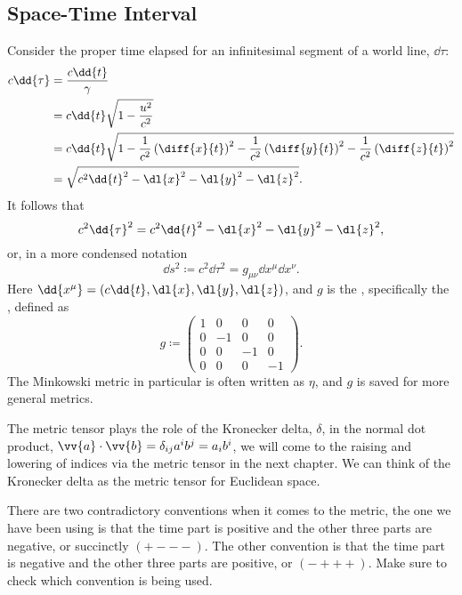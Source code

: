 \documentclass[fleqn]{NotesClass}
\begin{document}
    \subsection{Space-Time Interval}
    Consider the proper time elapsed for an infinitesimal segment of a world line, \(\dd{\tau}\):
    \begin{align}
        c\dd{\tau} &= \frac{c\dd{t}}{\gamma}\\
        &= c\dd{t}\sqrt{1 - \frac{u^2}{c^2}}\\
        &= c\dd{t}\sqrt{1 - \frac{1}{c^2}\left( \diff{x}{t} \right)^2 - \frac{1}{c^2}\left( \diff{y}{t} \right)^2 - \frac{1}{c^2}\left( \diff{z}{t} \right)^2}\\
        &= \sqrt{c^2\dd{t}^2 - \dl{x}^2 - \dl{y}^2 - \dl{z}^2}.
    \end{align}
    It follows that
    \begin{equation}
        c^2\dd{\tau}^2 = c^2\dd{t}^2 - \dl{x}^2 - \dl{y}^2 - \dl{z}^2,
    \end{equation}
    or, in a more condensed notation
    \begin{equation}
        \dd{s}^2 \coloneqq c^2\dd{\tau}^2 = g_{\mu\nu}\dd{x^\mu}\dd{x^\nu}.
    \end{equation}
    Here \(\dd{x^\mu} = (c\dd{t}, \dl{x}, \dl{y}, \dl{z})\), and \(g\) is the , specifically the , defined as
    \begin{equation}
        g \coloneqq 
        \begin{pmatrix}
            1 & 0 & 0 & 0\\
            0 & -1 & 0 & 0\\
            0 & 0 & -1 & 0\\
            0 & 0 & 0 & -1
        \end{pmatrix}
        .
    \end{equation}
    The Minkowski metric in particular is often written as \(\eta\), and \(g\) is saved for more general metrics.
    
    The metric tensor plays the role of the Kronecker delta, \(\delta\), in the normal dot product, \(\vv{a}\cdot\vv{b} = \delta_{ij}a^ib^j = a_ib^i\), we will come to the raising and lowering of indices via the metric tensor in the next chapter.
    We can think of the Kronecker delta as the metric tensor for Euclidean space.
    
    \begin{wrn}
        There are two contradictory conventions when it comes to the metric, the one we have been using is that the time part is positive and the other three parts are negative, or succinctly \(({+}{-}{-}{-})\).
        The other convention is that the time part is negative and the other three parts are positive, or \(({-}{+}{+}{+})\).
        Make sure to check which convention is being used.
    \end{wrn}
    
\end{document}
